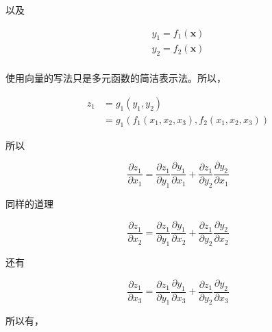 \documentclass[lang=cn,newtx,10pt,scheme=chinese]{elegantbook}
\begin{document}
以及

\begin{equation*}
\begin{matrix}
y_1 = f_1(\mathbf{x}) \\
y_2 = f_2(\mathbf{x}) \\
\end{matrix}
\end{equation*}

使用向量的写法只是多元函数的简洁表示法。所以，

\begin{equation*}
\begin{aligned}
z_1 &= g_1(y_1, y_2) \\
    &= g_1(f_1(x_1, x_2, x_3), f_2(x_1, x_2, x_3))
\end{aligned}
\end{equation*}

所以

\begin{equation*}
\frac{\partial z_1}{\partial x_1} = \frac{\partial z_1}{\partial y_1}\frac{\partial y_1}{\partial x_1}+\frac{\partial z_1}{\partial y_2}\frac{\partial y_2}{\partial x_1}
\end{equation*}

同样的道理

\begin{equation*}
\frac{\partial z_1}{\partial x_2} = \frac{\partial z_1}{\partial y_1}\frac{\partial y_1}{\partial x_2}+\frac{\partial z_1}{\partial y_2}\frac{\partial y_2}{\partial x_2}
\end{equation*}

还有

\begin{equation*}
\frac{\partial z_1}{\partial x_3} = \frac{\partial z_1}{\partial y_1}\frac{\partial y_1}{\partial x_3}+\frac{\partial z_1}{\partial y_2}\frac{\partial y_2}{\partial x_3}
\end{equation*}

所以有，
\end{document}
